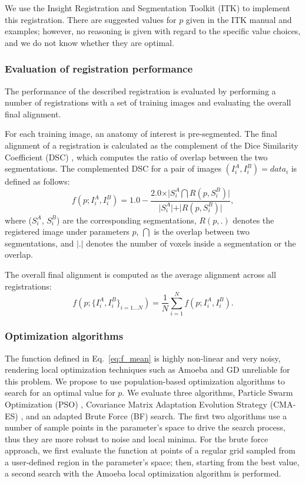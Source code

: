 \documentclass[]{spie}  %
\begin{document}
We use the Insight Registration and Segmentation Toolkit (ITK)\cite{itk:v2.4} to implement this registration. There are suggested values for $p$ given in the ITK manual and examples; however, no reasoning is given with regard to the specific value choices, and we do not know whether they are optimal.

\subsubsection{Evaluation of registration performance}

The performance of the described registration is evaluated by performing a number of registrations with a set of training images and evaluating the overall final alignment. 

For each training image, an anatomy of interest is pre-segmented. The final alignment of a registration is calculated as the complement of the Dice Similarity Coefficient (DSC) \cite{dsc}, which computes the ratio of overlap between the two segmentations. The complemented DSC for a pair of images $(I^A_i, I^B_i)=data_i$ is defined as follows:
\begin{equation}
f(p; I^A_i, I^B_i) = 1.0 - \frac{2.0 \times \vert S^A_i \bigcap R(p,S^B_i) \vert}{\vert S^A_i \vert + \vert R(p,S^B_i) \vert},
\end{equation}
where ($S^A_i$, $S^B_i$) are the corresponding segmentations, $R(p,.)$ denotes the registered image under parameters $p$, $\bigcap$ is the overlap between two segmentations, and $\vert . \vert$ denotes the number of voxels inside a segmentation or the overlap.

The overall final alignment is computed as the average alignment across all registrations:
\begin{equation}\label{eq:f_mean}
f(p; \{I^A_i, I^B_i\}_{i=1...N}) = \frac{1}{N}\sum^N_{i=1} f(p; I^A_i, I^B_i).
\end{equation}

\subsubsection{Optimization algorithms}

The function defined in Eq.~\ref{eq:f_mean} is highly non-linear and very noisy, rendering local optimization techniques such as Amoeba and GD unreliable for this problem. We propose to use population-based optimization algorithms to search for an optimal value for $p$. We evaluate three algorithms, Particle Swarm Optimization (PSO) \cite{Kennedy95:NN}, Covariance Matrix Adaptation Evolution Strategy (CMA-ES) \cite{Hansen06}, and an adapted Brute Force (BF) search. The first two algorithms use a number of sample points in the parameter's space to drive the search process, thus they are more robust to noise and local minima. For the brute force approach, we first evaluate the function at points of a regular grid sampled from a user-defined region in the parameter's space; then, starting from the best value, a second search with the Amoeba local optimization algorithm is performed.
\end{document}
